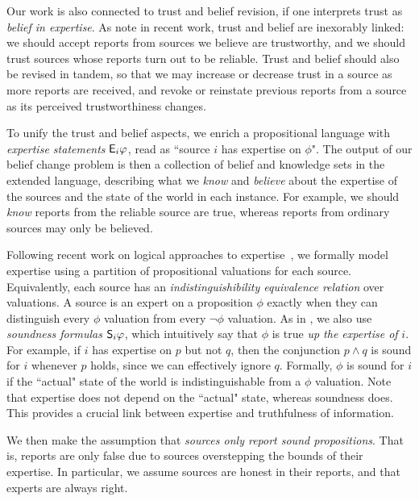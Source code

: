 Our work is also connected to trust and belief revision, if one interprets
trust as \emph{belief in expertise}. As \textcite{yasser_21} note in recent work,
trust and belief are inexorably linked: we should accept reports from sources
we believe are trustworthy, and we should trust sources whose reports turn out
to be reliable. Trust and belief should also be revised in tandem, so that we
may increase or decrease trust in a source as more reports are received,
and revoke or reinstate previous reports from a source as its perceived
trustworthiness changes.\footnotemark{}


To unify the trust and belief aspects, we enrich a propositional language with
\emph{expertise statements} $\E_i\phi$, read as ``source $i$ has expertise on
$\phi$". The output of our belief change problem is then a collection of belief
and knowledge sets in the extended language, describing what we \emph{know} and
\emph{believe} about the expertise of the sources and the state of the world in
each instance. For example, we should \emph{know} reports from the reliable
source are true, whereas reports from ordinary sources may only be believed.

Following recent work on logical approaches to
expertise~\cite{singleton2021logic,booth_trust_2018}, we formally model
expertise using a partition of propositional valuations for each source.
Equivalently, each source has an \emph{indistinguishibility equivalence
relation} over valuations. A source is an expert on a proposition $\phi$
exactly when they can distinguish every $\phi$ valuation from every
$\neg\phi$ valuation.\footnotemark{} As in \textcite{singleton2021logic}, we also
use \emph{soundness formulas} $\S_i\phi$, which intuitively say that $\phi$ is
true \emph{up the expertise of} $i$. For example, if $i$ has expertise on $p$
but not $q$, then the conjunction $p \land q$ is sound for $i$ whenever $p$
holds, since we can effectively ignore $q$. Formally,
$\phi$ is sound for $i$ if the ``actual" state of the world is
indistinguishable from a $\phi$ valuation. Note that expertise does not depend
on the ``actual" state, whereas soundness does. This provides a crucial link
between expertise and truthfulness of information.

We then make the assumption that \emph{sources only report sound propositions}.
That is, reports are only false due to sources overstepping the bounds of their
expertise. In particular, we assume sources are honest in their reports,
and that experts are always right.

